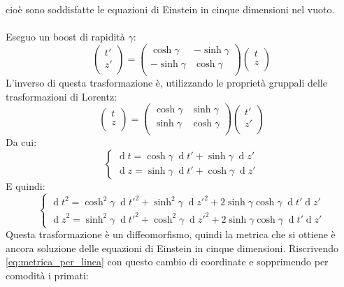 \documentclass[]{scrartcl}
\renewcommand{\d}[1]{\ensuremath{\operatorname{d}\!{#1}}}
\begin{document}
cioè sono soddisfatte le equazioni di Einstein in cinque dimensioni nel vuoto. \\ \\
Eseguo un boost di rapidità $ \gamma $:
\[
  \begin{pmatrix}
    t' \\
    z' \\
  \end{pmatrix}
  =
  \begin{pmatrix}
    \cosh \gamma & -\sinh \gamma \\
    -\sinh \gamma & \cosh \gamma \\
  \end{pmatrix}
  \begin{pmatrix}
    t \\
    z \\
  \end{pmatrix}
\]
L'inverso di questa trasformazione è, utilizzando le proprietà gruppali delle trasformazioni di Lorentz:
\[
  \begin{pmatrix}
    t \\
    z \\
  \end{pmatrix}
  =
  \begin{pmatrix}
    \cosh \gamma & \sinh \gamma \\
    \sinh \gamma & \cosh \gamma \\
  \end{pmatrix}
  \begin{pmatrix}
    t' \\
    z' \\
  \end{pmatrix}
\]
Da cui:
\[
  \begin{cases}
    \d t = \cosh \gamma \; \d t' + \sinh \gamma \; \d z' \\
    \d z = \sinh \gamma \; \d t' + \cosh \gamma \; \d z'
  \end{cases}
\]
E quindi:
\[
  \begin{cases}
    \d t^2 = \cosh^2 \gamma \; \d t'^2 + \sinh^2 \gamma \; \d z'^2 + 2 \sinh \gamma \cosh \gamma \; \d t' \d z' \\
    \d z^2 = \sinh^2 \gamma \; \d t'^2 + \cosh^2 \gamma \; \d z'^2 + 2 \sinh \gamma \cosh \gamma \; \d t' \d z'
  \end{cases}
\]
Questa trasformazione è un diffeomorfismo, quindi la metrica che si ottiene è ancora soluzione delle equazioni di Einstein in cinque
dimensioni.
Riscrivendo \eqref{eq:metrica_per_linea} con questo cambio di coordinate e sopprimendo per comodità i primati:
\end{document}
